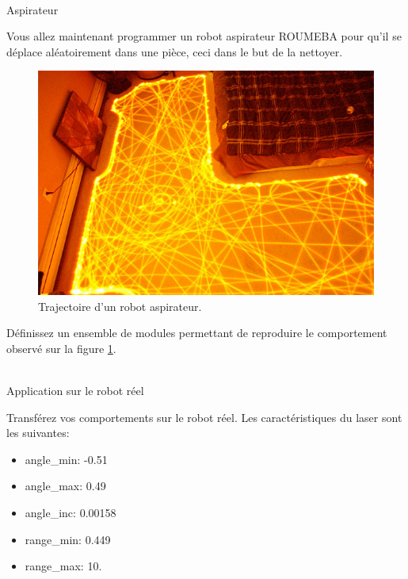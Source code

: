 \documentclass[11pt]{exam}
\begin{document}
~\\

{\Large Aspirateur} 

Vous allez maintenant programmer un robot aspirateur ROUMEBA pour qu'il se déplace aléatoirement dans une pièce, ceci dans le but de la nettoyer. 

\begin{figure}
\begin{center}
\includegraphics[width=0.7\linewidth]{./roomba-movements.jpg}
\end{center}
\caption{\label{fig:roomba} Trajectoire d'un robot aspirateur.}
\end{figure}

\begin{questions}
\begin{quest}
Définissez un ensemble de modules permettant de reproduire le comportement observé sur la figure \ref{fig:roomba}.
\end{quest}\end{questions}


~\\

{\Large Application sur le robot réel} 

Transférez vos comportements sur le robot réel. Les caractéristiques du laser sont les suivantes:
\begin{itemize}
\item angle\_min: -0.51
\item angle\_max: 0.49
\item angle\_inc: 0.00158
\item range\_min: 0.449
\item range\_max: 10. 
\end{itemize}
\end{document}
